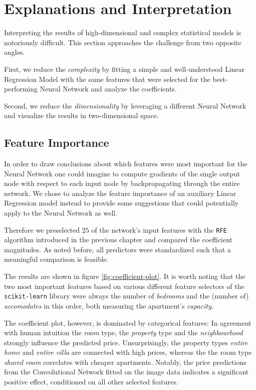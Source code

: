 \documentclass[12pt, letterpaper]{article}
\begin{document}
\section{Explanations and Interpretation}

Interpreting the results of high-dimensional and complex statistical models is notoriously difficult.
This section approaches the challenge from two opposite angles.

First, we reduce the \emph{complexity} by fitting a simple and well-understood Linear Regression Model with the same features that were selected for the best-performing Neural Network and analyze the coefficients.

Second, we reduce the \emph{dimensionality} by leveraging a different Neural Network and visualize the results in two-dimensional space.

\subsection{Feature Importance}

In order to draw conclusions about which features were most important for the Neural Network one could imagine to compute gradients of the single output node with respect to each input node by backpropagating through the entire network.
We chose to analyze the feature importance of an auxiliary Linear Regression model instead to provide some suggestions that could potentially apply to the Neural Network as well.

Therefore we preselected $25$ of the network's input features with the \texttt{RFE} algorithm introduced in the previous chapter and compared the coefficient magnitudes.
As noted before, all predictors were standardized such that a meaningful comparison is feasible.

The results are shown in figure \ref{fig:coefficient-plot}.
It is worth noting that the two most important features based on various different feature selectors of the \texttt{scikit-learn} library were always the number of \emph{bedrooms} and the (number of) \emph{accomodates} in this order, both measuring the apartment's \emph{capacity}.

The coefficient plot, however, is dominated by categorical features:
In agreement with human intuition the \emph{room} type, the \emph{property} type and the \emph{neighbourhood} strongly influence the predicted price.
Unsurprisingly, the property types \emph{entire home} and \emph{entire villa} are connected with high prices, whereas the the room type \emph{shared room} correlates with cheaper apartments.
Notably, the price predictions from the Convolutional Network fitted on the image data indicates a significant positive effect, conditioned on all other selected features.
\end{document}
